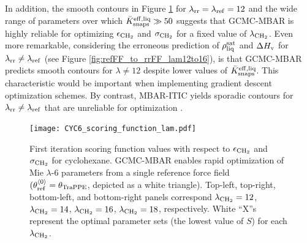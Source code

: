 \documentclass[journal=jced,manuscript=article]{achemso}
\begin{document}
In addition, the smooth contours in Figure \ref{fig:Score_CYC6} for $\lambda_{\rm rr} = \lambda_{\rm ref} = 12$ and the wide range of parameters over which $\bar K_{\rm snaps}^{\rm eff, liq} \gg 50$ suggests that GCMC-MBAR is highly reliable for optimizing $\epsilon_{\rm CH_2}$ and $\sigma_{\rm CH_2}$ for a fixed value of $\lambda_{\rm CH_2}$. Even more remarkable, considering the erroneous prediction of $\rho_{\rm liq}^{\rm sat}$ and $\Delta H_{\rm v}$ for $\lambda_{\rm rr} \neq \lambda_{\rm ref}$ (see Figure \ref{fig:refFF_to_rrFF_lam12to16}), is that GCMC-MBAR predicts smooth contours for $\lambda \neq 12$ despite lower values of $\bar K_{\rm snaps}^{\rm eff, liq}$. This characteristic would be important when implementing gradient descent optimization schemes. By contrast, MBAR-ITIC yields sporadic contours for $\lambda_{\rm rr} \neq \lambda_{\rm ref}$ that are unreliable for optimization \cite{Postdoc_1}. 



	\begin{figure}[htb!]
		\centering
		\texttt{[image: CYC6\_scoring\_function\_lam.pdf]}
		\caption{First iteration scoring function values with respect to $\epsilon_{\rm CH_2}$ and $\sigma_{\rm CH_2}$ for cyclohexane. GCMC-MBAR enables rapid optimization of Mie $\lambda$-6 parameters from a single reference force field $(\theta^{\langle0\rangle}_{\rm ref} = \theta_{\rm TraPPE}$, depicted as a white triangle). Top-left, top-right, bottom-left, and bottom-right panels correspond $\lambda_{\rm CH_2} = 12$, $\lambda_{\rm CH_2} = 14$, $\lambda_{\rm CH_2} = 16$, $\lambda_{\rm CH_2} = 18$, respectively. White ``X''s represent the optimal parameter sets (the lowest value of $S$) for each $\lambda_{\rm CH_2}$.} %
		\label{fig:Score_CYC6}
	\end{figure} 
\end{document}
